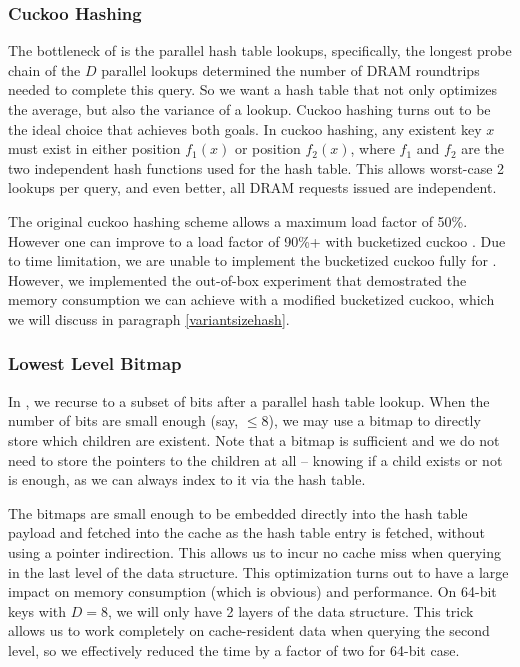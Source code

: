\documentclass[11pt, usletter]{article}
\begin{document}
\subsubsection*{Cuckoo Hashing}

The bottleneck of \MlpIndex is the parallel hash table lookups, 
specifically, the longest probe chain of the $D$ parallel lookups determined the number 
of DRAM roundtrips needed to complete this query. 
So we want a hash table that not only optimizes the average, but also the variance of a lookup. 
Cuckoo hashing \cite{cuckoohash} turns out to be the ideal choice that achieves both goals. 
In cuckoo hashing, any existent key $x$ must exist in either position $f_1(x)$ 
or position $f_2(x)$, where $f_1$ and $f_2$ are the two independent hash functions used for the hash table.
This allows worst-case 2 lookups per query, and even better, all DRAM requests issued are independent. 

The original cuckoo hashing scheme allows a maximum load factor of 50\%. 
However one can improve to a load factor of 90\%+ with bucketized cuckoo \cite{bucketcuckoo}. 
Due to time limitation, we are unable to implement the bucketized cuckoo fully for \MlpIndex. 
However, we implemented the out-of-box experiment that 
demostrated the memory consumption we can achieve with a modified bucketized cuckoo, 
which we will discuss in paragraph \ref{variantsizehash}.

\subsubsection*{Lowest Level Bitmap} \label{lowestlevelbitmap}

In \MlpIndex, we recurse to a subset of bits after a parallel hash table lookup. 
When the number of bits are small enough (say, $\leq 8$), we may use a bitmap 
to directly store which children are existent. 
Note that a bitmap is sufficient and we do not need to store the pointers to the children at all -- 
knowing if a child exists or not is enough, as we can always index to it via the hash table.

The bitmaps are small enough to be embedded directly into the hash table payload 
and fetched into the cache as the hash table entry is fetched, without using a pointer indirection. 
This allows us to incur no cache miss when querying in the last level of the data structure. 
This optimization turns out to have a large impact on memory consumption (which is obvious) and performance. 
On 64-bit keys with $D=8$, we will only have 2 layers of the data structure. 
This trick allows us to work completely on cache-resident data when querying the second level, 
so we effectively reduced the time by a factor of two for 64-bit case.
\end{document}

